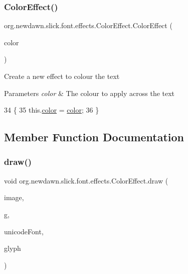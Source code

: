 \subsubsection{\texorpdfstring{Color\+Effect()}{ColorEffect()}\hspace{0.1cm}{\footnotesize\ttfamily [2/2]}}
{\footnotesize\ttfamily org.\+newdawn.\+slick.\+font.\+effects.\+Color\+Effect.\+Color\+Effect (\begin{DoxyParamCaption}\item[{Color}]{color }\end{DoxyParamCaption})\hspace{0.3cm}{\ttfamily [inline]}}

Create a new effect to colour the text


\begin{DoxyParams}{Parameters}
{\em color} & The colour to apply across the text \\
\hline
\end{DoxyParams}

\begin{DoxyCode}
34                                     \{
35         this.\mbox{\hyperlink{classorg_1_1newdawn_1_1slick_1_1font_1_1effects_1_1_color_effect_a2eb4f77d200293ea86166edce12f9817}{color}} = \mbox{\hyperlink{classorg_1_1newdawn_1_1slick_1_1font_1_1effects_1_1_color_effect_a2eb4f77d200293ea86166edce12f9817}{color}};
36     \}
\end{DoxyCode}


\subsection{Member Function Documentation}
\mbox{\label{classorg_1_1newdawn_1_1slick_1_1font_1_1effects_1_1_color_effect_a79fa23028d343b2779d582aa0f03a0fe}} 
\subsubsection{\texorpdfstring{draw()}{draw()}}
{\footnotesize\ttfamily void org.\+newdawn.\+slick.\+font.\+effects.\+Color\+Effect.\+draw (\begin{DoxyParamCaption}\item[{Buffered\+Image}]{image,  }\item[{Graphics2D}]{g,  }\item[{\mbox{\hyperlink{classorg_1_1newdawn_1_1slick_1_1_unicode_font}{Unicode\+Font}}}]{unicode\+Font,  }\item[{\mbox{\hyperlink{classorg_1_1newdawn_1_1slick_1_1font_1_1_glyph}{Glyph}}}]{glyph }\end{DoxyParamCaption})\hspace{0.3cm}{\ttfamily [inline]}}


